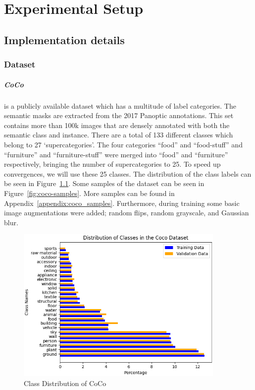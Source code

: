 \chapter{Experimental Setup}\label{chapter:experiments}

\section{Implementation details}
\subsection{Dataset}
\paragraph{CoCo~\cite{lin2015microsoftcococommonobjects}} is a publicly available dataset which has a multitude of label categories. The semantic masks are extracted from the 2017 Panoptic annotations. This set contains more than 100k images that are densely annotated with both the semantic class and instance. There are a total of 133 different classes which belong to 27 `supercategories'. The four categories ``food'' and ``food-stuff'' and ``furniture'' and ``furniture-stuff'' were merged into ``food'' and ``furniture'' respectively, bringing the number of supercategories to 25. To speed up convergences, we will use these 25 classes. The distribution of the class labels can be seen in Figure~\ref{fig:coco-class-distribution}. Some samples of the dataset can be seen in Figure~\ref{fig:coco-samples}. More samples can be found in Appendix~\ref{appendix:coco_samples}. Furthermore, during training some basic image augmentations were added; random flips, random grayscale, and Gaussian blur.


\begin{figure}[h]
    \centering
    \includegraphics[width=0.9\textwidth]{figures/datasets/coco/class_distribution.png}
    \caption{Class Distribution of CoCo}
    \label{fig:coco-class-distribution}
\end{figure}

